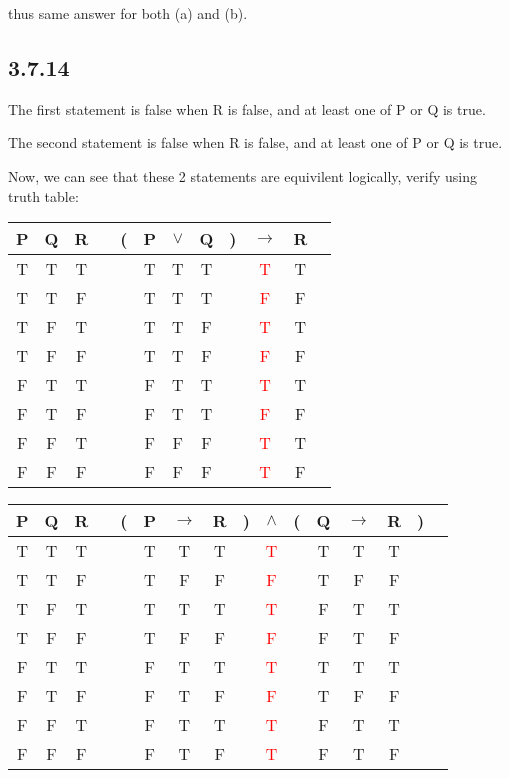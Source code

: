 \documentclass{article}
\begin{document}
thus same answer for both (a) and (b).

\subsection*{3.7.14}

The first statement is false when R is false, and at least one of P or Q is true.

The second statement is false when R is false, and at least one of P or Q is true. 

Now, we can see that these 2 statements are equivilent logically, verify using truth table:

\begin{tabular}{@{ }c@{ }@{ }c@{ }@{ }c | c@{ }@{}c@{}@{ }c@{ }@{ }c@{ }@{ }c@{ }@{}c@{}@{ }c@{ }@{ }c@{ }@{ }c}
P & Q & R &  & ( & P & $\lor$ & Q & ) & $\rightarrow$ & R & \\
\hline 
T & T & T &  &  & T & T & T &  & \textcolor{red}{T} & T & \\
T & T & F &  &  & T & T & T &  & \textcolor{red}{F} & F & \\
T & F & T &  &  & T & T & F &  & \textcolor{red}{T} & T & \\
T & F & F &  &  & T & T & F &  & \textcolor{red}{F} & F & \\
F & T & T &  &  & F & T & T &  & \textcolor{red}{T} & T & \\
F & T & F &  &  & F & T & T &  & \textcolor{red}{F} & F & \\
F & F & T &  &  & F & F & F &  & \textcolor{red}{T} & T & \\
F & F & F &  &  & F & F & F &  & \textcolor{red}{T} & F & \\
\end{tabular}

\begin{tabular}{@{ }c@{ }@{ }c@{ }@{ }c | c@{ }@{}c@{}@{ }c@{ }@{ }c@{ }@{ }c@{ }@{}c@{}@{ }c@{ }@{}c@{}@{ }c@{ }@{ }c@{ }@{ }c@{ }@{}c@{}@{ }c}
P & Q & R &  & ( & P & $\rightarrow$ & R & ) & $\land$ & ( & Q & $\rightarrow$ & R & ) & \\
\hline 
T & T & T &  &  & T & T & T &  & \textcolor{red}{T} &  & T & T & T &  & \\
T & T & F &  &  & T & F & F &  & \textcolor{red}{F} &  & T & F & F &  & \\
T & F & T &  &  & T & T & T &  & \textcolor{red}{T} &  & F & T & T &  & \\
T & F & F &  &  & T & F & F &  & \textcolor{red}{F} &  & F & T & F &  & \\
F & T & T &  &  & F & T & T &  & \textcolor{red}{T} &  & T & T & T &  & \\
F & T & F &  &  & F & T & F &  & \textcolor{red}{F} &  & T & F & F &  & \\
F & F & T &  &  & F & T & T &  & \textcolor{red}{T} &  & F & T & T &  & \\
F & F & F &  &  & F & T & F &  & \textcolor{red}{T} &  & F & T & F &  & \\
\end{tabular}
\end{document}
